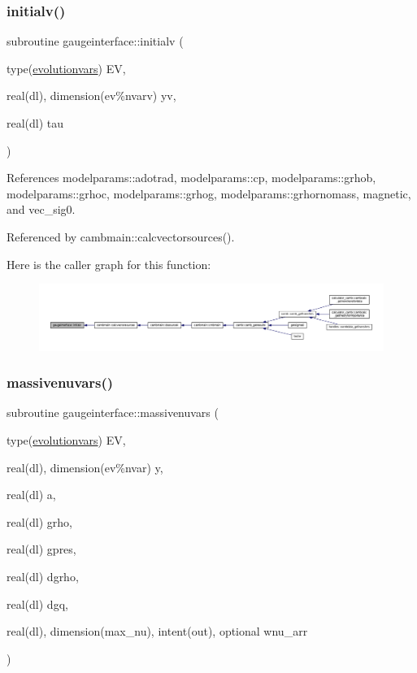 \subsubsection{\texorpdfstring{initialv()}{initialv()}}
{\footnotesize\ttfamily subroutine gaugeinterface\+::initialv (\begin{DoxyParamCaption}\item[{type(\mbox{\hyperlink{structgaugeinterface_1_1evolutionvars}{evolutionvars}})}]{EV,  }\item[{real(dl), dimension(ev\%nvarv)}]{yv,  }\item[{real(dl)}]{tau }\end{DoxyParamCaption})}



References modelparams\+::adotrad, modelparams\+::cp, modelparams\+::grhob, modelparams\+::grhoc, modelparams\+::grhog, modelparams\+::grhornomass, magnetic, and vec\+\_\+sig0.



Referenced by cambmain\+::calcvectorsources().

Here is the caller graph for this function\+:
\nopagebreak
\begin{figure}[H]
\begin{center}
\leavevmode
\includegraphics[width=350pt]{namespacegaugeinterface_aeed464df3ecab21d57bcb789fe3b1a22_icgraph}
\end{center}
\end{figure}
\mbox{\label{namespacegaugeinterface_ae4228ed9cfb9382025eb84617b0ed091}} 
\subsubsection{\texorpdfstring{massivenuvars()}{massivenuvars()}}
{\footnotesize\ttfamily subroutine gaugeinterface\+::massivenuvars (\begin{DoxyParamCaption}\item[{type(\mbox{\hyperlink{structgaugeinterface_1_1evolutionvars}{evolutionvars}})}]{EV,  }\item[{real(dl), dimension(ev\%nvar)}]{y,  }\item[{real(dl)}]{a,  }\item[{real(dl)}]{grho,  }\item[{real(dl)}]{gpres,  }\item[{real(dl)}]{dgrho,  }\item[{real(dl)}]{dgq,  }\item[{real(dl), dimension(max\+\_\+nu), intent(out), optional}]{wnu\+\_\+arr }\end{DoxyParamCaption})}



